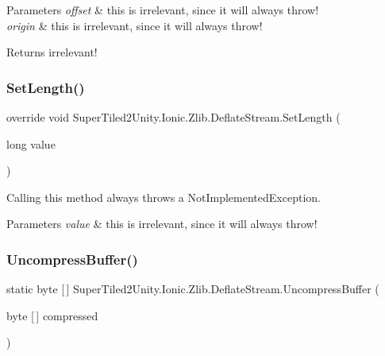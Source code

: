 \begin{DoxyParams}{Parameters}
{\em offset} & this is irrelevant, since it will always throw!\\
\hline
{\em origin} & this is irrelevant, since it will always throw!\\
\hline
\end{DoxyParams}
\begin{DoxyReturn}{Returns}
irrelevant!
\end{DoxyReturn}
\mbox{\label{class_super_tiled2_unity_1_1_ionic_1_1_zlib_1_1_deflate_stream_a858dc9267970f954e56efd4711fad616}} 
\subsubsection{\texorpdfstring{Set\+Length()}{SetLength()}}
{\footnotesize\ttfamily override void Super\+Tiled2\+Unity.\+Ionic.\+Zlib.\+Deflate\+Stream.\+Set\+Length (\begin{DoxyParamCaption}\item[{long}]{value }\end{DoxyParamCaption})}



Calling this method always throws a Not\+Implemented\+Exception. 


\begin{DoxyParams}{Parameters}
{\em value} & this is irrelevant, since it will always throw!\\
\hline
\end{DoxyParams}
\mbox{\label{class_super_tiled2_unity_1_1_ionic_1_1_zlib_1_1_deflate_stream_a364d406060c289fba5398174788e92b9}} 
\subsubsection{\texorpdfstring{Uncompress\+Buffer()}{UncompressBuffer()}}
{\footnotesize\ttfamily static byte \mbox{[}$\,$\mbox{]} Super\+Tiled2\+Unity.\+Ionic.\+Zlib.\+Deflate\+Stream.\+Uncompress\+Buffer (\begin{DoxyParamCaption}\item[{byte \mbox{[}$\,$\mbox{]}}]{compressed }\end{DoxyParamCaption})\hspace{0.3cm}{\ttfamily [static]}}



